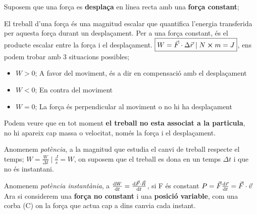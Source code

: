 \documentclass[12pt]{article}
\begin{document}
Suposem que una força es \textbf{desplaça} en línea recta amb una \textbf{força constant};

\begin{center}
\end{center}

El treball d’una força és una magnitud escalar que quantifica l’energia transferida per aquesta força durant un desplaçament. Per a una força constant, és el producte escalar entre la força i el desplaçament. $\boxed{W = \vec{F} \cdot \Delta \vec{r} \mid N \cross m = J}$, ens podem trobar amb 3 situacions possibles;

\begin{itemize}
    \item $W > 0$; A favor del moviment, és a dir en compensació amb el desplaçament
    \item $W < 0$; En contra del moviment
    \item $W = 0$; La força és perpendicular al moviment o no hi ha desplaçament
\end{itemize}

Podem veure que en tot moment \textbf{el treball no esta associat a la particula}, no hi apareix cap massa o velocitat, només la força i el desplaçament.

Anomenem \textit{potència}, a la magnitud que estudia el canvi de treball respecte el temps; $\boxed{W = \frac{W}{\Delta t} \mid \frac{J}{s} = W}$, on suposem que el treball es dona en un temps $\Delta t$ i que no és instantani.

Anomenem \textit{potència instantània}, a $\dv{W}{t} = \dv{\vec{F} \cdot \vec{R}}{t}$, si F és constant $P = \vec{F} \dv{\vec{r}}{t} = \vec{F} \cdot \vec{v}$
Ara si considerem una \textbf{força no constant} i una \textbf{posició variable}, com una corba (C) on la força que actua cap a dins canvia cada instant.
\end{document}
